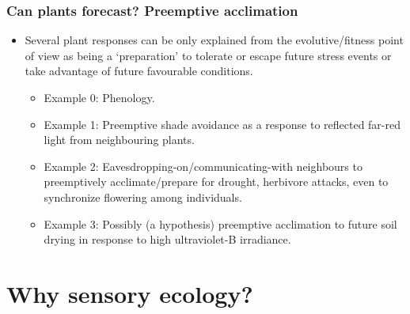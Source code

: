 \documentclass[10pt]{beamer}\usepackage[]{graphicx}\usepackage[]{color}
\begin{document}
\begin{frame}[<+->]
  \frametitle{Can plants forecast? Preemptive acclimation}
   \begin{itemize}
    \item Several plant responses can be only explained from the evolutive/fitness
    point of view as being a `preparation' to tolerate or escape future stress events or
    take advantage of future favourable conditions.
    \begin{itemize}
    \item Example 0: Phenology.
    \item Example 1: Preemptive shade avoidance as a response to reflected far-red light from neighbouring
    plants.
    \item Example 2: Eavesdropping-on/communicating-with neighbours to preemptively acclimate/prepare
    for drought, herbivore attacks, even to synchronize flowering among individuals.
    \item Example 3: Possibly (a hypothesis) preemptive acclimation to future soil
    drying in response to high ultraviolet-B irradiance.
 \end{itemize}
  \end{itemize}
\end{frame}

\section{Why sensory ecology?}

\end{document}
